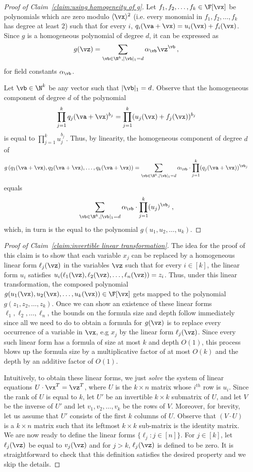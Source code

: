 \begin{proof}[Proof of Claim~\ref{claim:using homogeneity of g}]
Let $f_1, f_2, \ldots, f_k \in \F[\vx]$ be polynomials which are zero modulo $\langle \vx \rangle^2$ (i.e. every monomial in $f_1, f_2, \ldots, f_k$ has degree at least $2$) such that for every $i$, $q_i(\va + \vx) = u_i(\vx) + f_i(\vx)$. Since $g$ is a  homogeneous polynomial of degree $d$, it can be expressed as 
\[
g(\vz) = \sum_{\vb \in \N^k, |\vb|_1 = d} \alpha_{\vb} \vz^{\vb} \,  ,
\] for field constants $\alpha_{\vb}$. 
%
  
Let $\vb \in \N^k$ be any vector such that $|\vb|_1 = d$. Observe that the homogeneous component of degree  $d$ of the polynomial 
\[
\prod_{j = 1}^k q_j(\va + \vx)^{b_j} = \prod_{j = 1}^k (u_j(\vx) + f_j(\vx))^{b_j}
\] is equal to $\prod_{j = 1}^k u_j^{b_j} \, .
$
  Thus, by linearity, the homogeneous component of degree $d$ of  \[
  g\left(q_1(\va + \vx), q_2(\va + \vx), \ldots, q_k(\va + \vx)\right) = \sum_{\vb \in \N^k, |\vb|_1 = d} \alpha_{\vb} \cdot \prod_{j = 1}^k (q_j(\va + \vx ))^{\vb_j}\]
   equals \[
   \sum_{\vb \in \N^k, |\vb|_1 = d} \alpha_{\vb}\cdot  \prod_{j = 1}^k (u_j)^{\vb_j} \, , 
   \] which, in turn is the equal to the polynomial $g(u_1, u_2, \ldots, u_k)$.
\end{proof} 
%
\begin{proof}[Proof of Claim~\ref{claim:invertible linear transformation}]
The idea for the proof of this claim is to show that each variable $x_j$ can be replaced by a homogeneous linear form $\ell_j(\vz)$ in the variables $\vz$ such that for every $i \in [k]$, the linear form $u_i$ satisfies $u_i(\ell_1(\vz), \ell_2(\vz), \ldots, \ell_n(\vz)) = z_i$. Thus, under this linear transformation, the composed polynomial $g(u_1(\vx), u_2(\vx), \ldots, u_k(\vx)) \in \F[\vx]$ gets mapped to the polynomial $g(z_1, z_2, \ldots, z_k)$.  Once we can show an existence of these linear forms $\ell_1, \ell_2, \ldots, \ell_n$, the bounds on the formula size and depth follow immediately since all we need to do to obtain a formula for $g(\vz)$ is to replace every occurrence of a variable in $\vx$, e.g $x_j$ by the linear form $\ell_j(\vz)$. Since every such linear form has a formula of size at most $k$ and depth $O(1)$, this process blows up the formula size by a multiplicative factor of at most $O(k)$ and the depth by an additive factor of $O(1)$. 

Intuitively, to obtain these linear forms, we just \emph{solve} the system of linear equations  $U \cdot \vx^{T} = \vz^T$, where $U$ is the $k \times n$ matrix whose $i^{th}$ row is $u_i$.  Since  the rank of $U$ is equal to $k$,  let $U'$ be an invertible $k \times k$ submatrix of $U$, and let $V$ be the inverse of $U'$ and let $v_1, v_2, \ldots, v_k$ be the rows of $V$. Moreover, for brevity, let us assume that $U'$ consists of the first $k$ columns of $U$. Observe that $(V\cdot U)$ is a $k \times n$ matrix such that its leftmost $k \times k$ sub-matrix is the identity matrix. We are now ready to define the linear forms $\{\ell_j : j \in [n]\}$.  For $j \in [k]$, let $\ell_j(\vz)$ be equal to $v_j(\vz)$ and for $j > k$, $\ell_j(\vz)$ is defined to be zero. It is straightforward to check that this definition satisfies the desired property and we skip the details. 
\end{proof}
%
